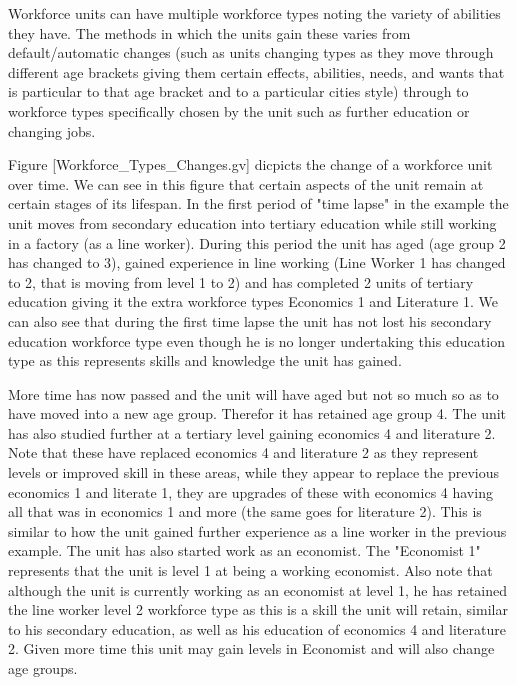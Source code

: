 Workforce units can have multiple workforce types noting the variety of abilities they have. The methods in which the units gain these varies from default/automatic changes (such as units changing types as they move through different age brackets giving them certain effects, abilities, needs, and wants that is particular to that age bracket and to a particular cities style) through to workforce types specifically chosen by the unit such as further education or changing jobs. 

Figure [Workforce_Types_Changes.gv] dicpicts the change of a workforce unit over time. We can see in this figure that certain aspects of the unit remain at certain stages of its lifespan. In the first period of "time lapse" in the example the unit moves from secondary education into tertiary education while still working in a factory (as a line worker). During this period the unit has aged (age group 2 has changed to 3), gained experience in line working (Line Worker 1 has changed to 2, that is moving from level 1 to 2) and has completed 2 units of tertiary education giving it the extra workforce types Economics 1 and Literature 1. We can also see that during the first time lapse the unit has not lost his secondary education workforce type even though he is no longer undertaking this education type as this represents skills and knowledge the unit has gained. 

More time has now passed and the unit will have aged but not so much so as to have moved into a new age group. Therefor it has retained age group 4. The unit has also studied further at a tertiary level gaining economics 4 and literature 2. Note that these have replaced economics 4 and literature 2 as they represent levels or improved skill in these areas, while they appear to replace the previous economics 1 and literate 1, they are upgrades of these with economics 4 having all that was in economics 1 and more (the same goes for literature 2). This is similar to how the unit gained further experience as a line worker in the previous example. The unit has also started work as an economist. The "Economist 1" represents that the unit is level 1 at being a working economist. Also note that although the unit is currently working as an economist at level 1, he has retained the line worker level 2 workforce type as this is a skill the unit will retain, similar to his secondary education, as well as his education of economics 4 and literature 2. Given more time this unit may gain levels in Economist and will also change age groups. 

